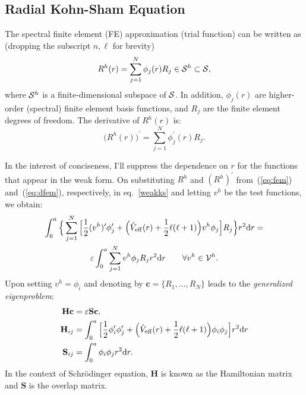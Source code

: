 \documentclass[12pt,dvipsnames]{article}
\newcommand{\eref}[1]{(\ref{#1})}
\newcommand{\vm}[1]{\mathbf{#1}}
\begin{document}
\subsection{Radial Kohn-Sham Equation}
The spectral finite element (FE) approximation (trial function) can be written as 
(dropping the subscript $n, \ell$ for brevity)
\begin{equation}	\label{eq:fem}
R^h (r) = \sum_{j=1}^N \phi_j(r) R_j \in {\cal S}^h \subset {\cal S},
\end{equation}
where ${\cal S}^h$ is a finite-dimensional subspace of ${\cal S}$. In
addition, $\phi_j(r)$ are higher-order (spectral) finite element 
basis functions, and $R_j$ are the finite element degrees of freedom. 
The derivative of $R^h(r)$ is:
\begin{equation}\label{eq:dfem}
\bigl(R^h(r)\bigr)^\prime = \sum_{j=1}^N \phi_j^\prime (r) R_j.
\end{equation}

\noindent
In the interest of conciseness, I'll suppress the
dependence on $r$ for the functions that appear in the weak
form. On substituting $R^h$ and $(R^h)^\prime$
from~\eref{eq:fem} and~\eref{eq:dfem}, respectively, in eq.~\eqref{weakks}
 and letting $v^h$ be the test functions, we obtain:
\begin{multline*}
\int_0^a \Big\{ \sum_{j=1}^N \Big[ \frac{1}{2} (v^h)^\prime \phi_j^\prime + 
\Big( \hat{V}_{\rm{eff}}(r) + \frac{1}{2}\ell(\ell + 1) \Big ) v^h \phi_j \Big] R_j \Big\} r^2 \mathrm{d} r = \\
\varepsilon \int_0^a \sum_{j=1}^N v^h \phi_j R_j r^2 \mathrm{d} r \qquad \forall v^h \in {\cal V}^h.
\end{multline*}
Upon setting $v^h = \phi_i$ and denoting by $\vm{c} = \{R_1, \ldots, R_N\}$ leads to the \emph{ generalized eigenproblem}:
\begin{subequations}\label{eq:eigproblem}
\begin{align}
\vm{H}\vm{c} &= \varepsilon \vm{S} \vm{c}, \label{geneig}\\
\vm{H}_{ij} & = \int_0^a \Big[ \frac{1}{2} \phi_i^\prime \phi_j^\prime + 
\Big( \hat{V}_{\rm{eff}}(r) + \frac{1}{2}\ell(\ell + 1) \Big ) \phi_i \phi_j \Big] r^2 \mathrm{d} r \\
\vm{S}_{ij} & =  \int_0^a \phi_i \phi_j r^2 \mathrm{d} r.
\end{align}
\end{subequations} 
In the context of Schr\"odinger equation, $\vm{H}$ is known as the Hamiltonian matrix and 
$\vm{S}$ is the overlap matrix.
%
\end{document}
